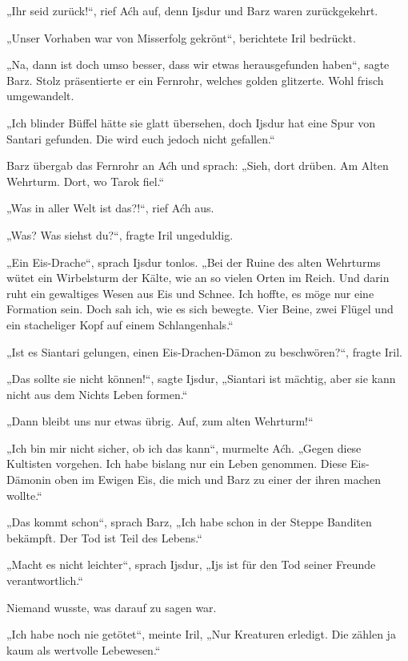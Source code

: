 „Ihr seid zurück!“, rief Aćh auf, denn Ijsdur und Barz waren zurückgekehrt.

„Unser Vorhaben war von Misserfolg gekrönt“, berichtete Iril bedrückt.

„Na, dann ist doch umso besser, dass wir etwas herausgefunden haben“, sagte Barz. Stolz präsentierte er ein Fernrohr, welches golden glitzerte. Wohl frisch umgewandelt.

„Ich blinder Büffel hätte sie glatt übersehen, doch Ijsdur hat eine Spur von Santari gefunden. Die wird euch jedoch nicht gefallen.“

Barz übergab das Fernrohr an Aćh und sprach: „Sieh, dort drüben. Am Alten Wehrturm. Dort, wo Tarok fiel.“

„Was in aller Welt ist das?!“, rief Aćh aus.

„Was? Was siehst du?“, fragte Iril ungeduldig.

„Ein Eis-Drache“, sprach Ijsdur tonlos. „Bei der Ruine des alten Wehrturms wütet ein Wirbelsturm der Kälte, wie an so vielen Orten im Reich. Und darin ruht ein gewaltiges Wesen aus Eis und Schnee. Ich hoffte, es möge nur eine Formation sein. Doch sah ich, wie es sich bewegte. Vier Beine, zwei Flügel und ein stacheliger Kopf auf einem Schlangenhals.“

„Ist es Siantari gelungen, einen Eis-Drachen-Dämon zu beschwören?“, fragte Iril.

„Das sollte sie nicht können!“, sagte Ijsdur, „Siantari ist mächtig, aber sie kann nicht aus dem Nichts Leben formen.“

„Dann bleibt uns nur etwas übrig. Auf, zum alten Wehrturm!“\bigskip







„Ich bin mir nicht sicher, ob ich das kann“, murmelte Aćh. „Gegen diese Kultisten vorgehen. Ich habe bislang nur ein Leben genommen. Diese Eis-Dämonin oben im Ewigen Eis, die mich und Barz zu einer der ihren machen wollte.“

„Das kommt schon“, sprach Barz, „Ich habe schon in der Steppe Banditen bekämpft. Der Tod ist Teil des Lebens.“

„Macht es nicht leichter“, sprach Ijsdur, „Ijs ist für den Tod seiner Freunde verantwortlich.“

Niemand wusste, was darauf zu sagen war.

„Ich habe noch nie getötet“, meinte Iril, „Nur Kreaturen erledigt. Die zählen ja kaum als wertvolle Lebewesen.“


